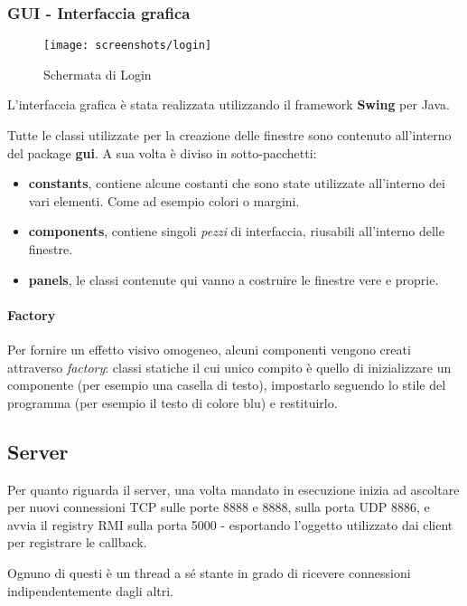 \subsubsection{GUI - Interfaccia grafica}
\begin{wrapfigure}[10]{r}{0.4\textwidth}
\caption*{{\scriptsize Schermata di Login}}
\centering
\texttt{[image: screenshots/login]}
\end{wrapfigure}

L'interfaccia grafica è stata realizzata utilizzando il framework \textbf{Swing} per Java.

Tutte le classi utilizzate per la creazione delle finestre sono contenuto all'interno del package \textbf{gui}. A sua volta è diviso in sotto-pacchetti:
\begin{itemize}
    \item \textbf{constants}, contiene alcune costanti che sono state utilizzate all'interno dei vari elementi. Come ad esempio colori o margini.
    \item \textbf{components}, contiene singoli \textit{pezzi} di interfaccia, riusabili all'interno delle finestre.
    \item \textbf{panels}, le classi contenute qui vanno a costruire le finestre vere e proprie.
\end{itemize}

\paragraph{Factory}
Per fornire un effetto visivo omogeneo, alcuni componenti vengono creati attraverso \textit{factory}: classi statiche il cui unico compito è quello di inizializzare un componente (per esempio una casella di testo), impostarlo seguendo lo stile del programma (per esempio il testo di colore blu) e restituirlo.

\subsection{Server}

Per quanto riguarda il server, una volta mandato in esecuzione inizia ad ascoltare per nuovi connessioni TCP sulle porte 8888 e 8888, sulla porta UDP 8886, e avvia il registry RMI sulla porta 5000 - esportando l'oggetto utilizzato dai client per registrare le callback.

Ognuno di questi è un thread a sé stante in grado di ricevere connessioni indipendentemente dagli altri.

